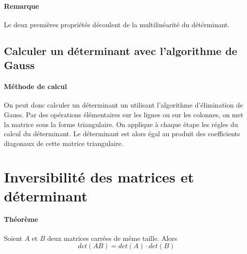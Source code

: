 \paragraph{Remarque} Le deux premières propriétés découlent de la multilinéarité du détérminant.

%
\subsection{Calculer un déterminant avec l'algorithme de Gauss}
%
\paragraph{Méthode de calcul} On peut donc calculer un déterminant un utilisant l'algorithme d'élimination de Gauss. Par des opérations élémentaires sur les lignes ou sur les colonnes, on met la matrice sous la forme triangulaire. On applique à chaque étape les régles du calcul du déterminant. Le déterminant est alors égal au produit des coefficients diagonaux de cette matrice triangulaire.

%
%
\section{Inversibilité des matrices et déterminant}
%
%
\paragraph{Théorème} Soient $A$ et $B$ deux matrices carrées de même taille. Alors 
$$det(A B) = det(A) \cdot det(B)$$


